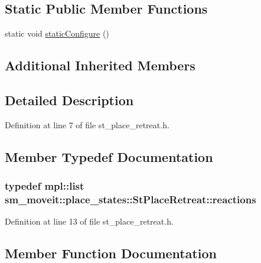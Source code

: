 \subsection*{Static Public Member Functions}
\begin{DoxyCompactItemize}
\item 
static void \hyperlink{structsm__moveit_1_1place__states_1_1StPlaceRetreat_a6f2a55cf2350568bf054c20eb9a59c94}{static\+Configure} ()
\end{DoxyCompactItemize}
\subsection*{Additional Inherited Members}


\subsection{Detailed Description}


Definition at line 7 of file st\+\_\+place\+\_\+retreat.\+h.



\subsection{Member Typedef Documentation}
\subsubsection[{\texorpdfstring{reactions}{reactions}}]{\setlength{\rightskip}{0pt plus 5cm}typedef mpl\+::list {\bf sm\+\_\+moveit\+::place\+\_\+states\+::\+St\+Place\+Retreat\+::reactions}}\hypertarget{structsm__moveit_1_1place__states_1_1StPlaceRetreat_a9bf92659dcf05ff9f3a9f6828e69d6a4}{}\label{structsm__moveit_1_1place__states_1_1StPlaceRetreat_a9bf92659dcf05ff9f3a9f6828e69d6a4}


Definition at line 13 of file st\+\_\+place\+\_\+retreat.\+h.



\subsection{Member Function Documentation}
